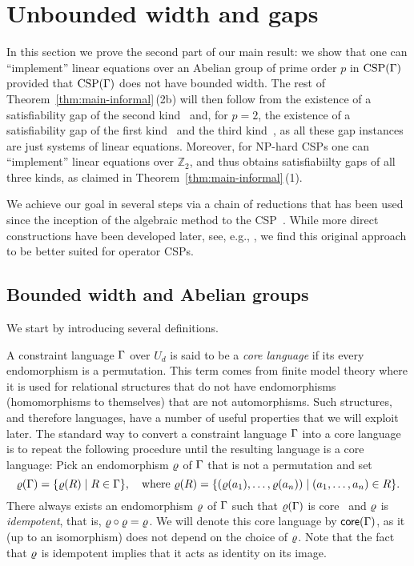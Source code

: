 \documentclass[11pt,letter]{article}
\begin{document}
 

\section{Unbounded width and gaps}\label{sec:gap}

In this section we prove the second part of our main result: we show that one
can ``implement'' linear equations over an Abelian group of prime order $p$
in ${\rm CSP}(\Gamma)$ provided that ${\rm CSP}(\Gamma)$ does not have bounded width. The rest
of Theorem~\ref{thm:main-informal}\,(2b) will then follow from the existence of a
satisfiability gap of the second kind~\cite{SZ24:personal} and, for $p=2$, the
existence of a satisfiability gap of the first
kind~\cite{Mermin1990simple,Mermin1993hidden,Peres1990incompatible} and the
third kind~\cite{Slofstra20:jams}, as all these gap instances are just systems
of linear equations. Moreover, for NP-hard CSPs one can ``implement'' linear
equations over $\mathbb{Z}_2$, and thus obtains satisfiabiilty gaps of all three
kinds, as claimed in Theorem~\ref{thm:main-informal}\,(1).

We achieve our goal in several steps via a chain of reductions that has been
used since the inception of the algebraic method to the
CSP~\cite{Bulatov05:classifying}. While more direct constructions have been
developed later, see, e.g., \cite{BKW17}, we find this original approach to be
better suited for operator CSPs.


\subsection{Bounded width and Abelian groups}

We start by introducing several definitions. 

A constraint language $\Gamma$ over $U_d$ is said to be a \emph{core language} if
its every endomorphism is a permutation.
This term comes from finite model theory where it is used for relational structures that do not have endomorphisms (homomorphisms to themselves) that are not automorphisms. Such structures, and therefore languages, have a number of useful properties that we will exploit later. The standard way to convert a constraint language $\Gamma$ into a core language is to repeat the following procedure until the resulting language is a core language: Pick an endomorphism $\varrho$ of $\Gamma$ that is not a permutation and set 
\[
\varrho(\Gamma)=\{\varrho(R)\mid R\in\Gamma\}, \quad\text{where } \varrho(R)=\{(\varrho(a_1),\ldots, \varrho(a_n))\mid  (a _1,\ldots, a _{n})\in R\}.
\]
There always exists an endomorphism $\varrho$ of $\Gamma$ such that $\varrho(\Gamma)$ is
core~\cite{Bulatov05:classifying,BKW17} and $\varrho$ is \emph{idempotent}, that is, $\varrho\circ\varrho=\varrho$. We will denote this core language by $\mathsf{core}(\Gamma)$, as it (up to an isomorphism) does not depend on the choice of $\varrho$. Note that the fact that $\varrho$ is idempotent implies that it acts as identity on its image.
\end{document}
